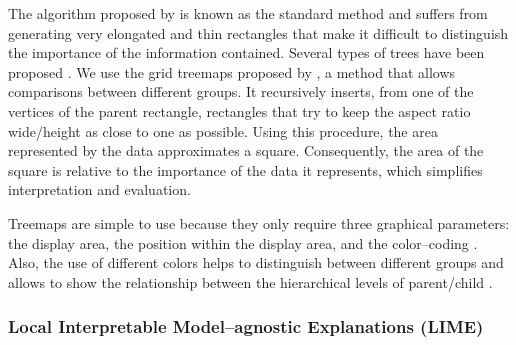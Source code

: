 \documentclass[5p,authoryear,preprint,12pt]{elsarticle}
\begin{document}
The algorithm proposed by \citet{johnson1991tree} is known as the standard method and suffers from generating very elongated and thin rectangles that make it difficult to distinguish the importance of the information contained. Several types of trees have been proposed \citep{shneiderman2001ordered, bederson2002ordered, cesarano2016heuristic}. We use the grid treemaps proposed by \citet{bruls2000squarified}, a method that allows comparisons between different groups. It recursively inserts, from one of the vertices of the parent rectangle, rectangles that try to keep the aspect ratio wide/height as close to one as possible. Using this procedure, the area represented by the data approximates a square. Consequently, the area of the square is relative to the importance of the data it represents, which simplifies interpretation and evaluation. 

Treemaps are simple to use because they only require three graphical parameters: the display area, the position within the display area, and the color--coding \citep{tu2007visualizing}. Also, the use of different colors helps to distinguish between different groups and allows to show the relationship between the hierarchical levels of parent/child \citep{tu2007visualizing}. 


\subsubsection{Local Interpretable Model--agnostic Explanations (LIME)}
\end{document}
